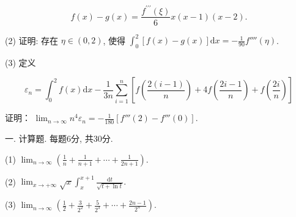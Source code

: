 \documentclass{examcollection}
\renewcommand{\displayformula}[1]{\[#1\]}
\begin{document}
{\begin{minipage}{\textwidth}
\displayformula{f (x) - g (x) = \frac {f ^ {\prime \prime \prime} (\xi)}{6} x (x - 1) (x - 2).}\par
(2) 证明: 存在 $\eta \in (0,2)$, 使得 $\int_0^2 [f(x) - g(x)]\mathrm{d}x = -\frac{1}{90} f''''(\eta)$.\par
(3) 定义\par
\displayformula{\varepsilon_ {n} = \int_ {0} ^ {2} f (x) \mathrm{d} x - \frac {1}{3 n} \sum_ {i = 1} ^ {n} \left[ f \left(\frac {2 (i - 1)}{n}\right) + 4 f \left(\frac {2 i - 1}{n}\right) + f \left(\frac {2 i}{n}\right) \right]}\par
证明： $\lim_{n\to \infty}n^4\varepsilon_n = -\frac{1}{180} [f'''(2) - f'''(0)].$\par
{}\smallskip
一. 计算题. 每题6分, 共30分.\par
(1)  $\lim_{n\to\infty}\left(\frac{1}{n}+\frac{1}{n+1}+\cdots+\frac{1}{2n+1}\right).$\par
(2) $\lim_{x\to +\infty}\sqrt{x}\int_{x}^{x + 1}\frac{\mathrm{d}t}{\sqrt{t + \ln t}}.$\par
(3)  $\lim_{n\to\infty}\left(\frac{1}{2}+\frac{3}{2^{2}}+\frac{5}{2^{3}}+\cdots+\frac{2n-1}{2^{n}}\right).$\par
\end{minipage}}
\ifdim\dimexpr\ht\proofbox+\dp\proofbox\relax>\textheight
\noindent\resizebox{!}{\textheight}{\usebox{\proofbox}}\else\noindent\usebox{\proofbox}\fi\clearpage
\end{document}
